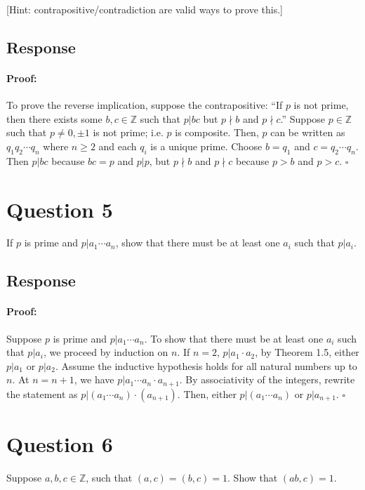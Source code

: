 \documentclass [12pt] {article}
\newcommand{\Z}{\mathbb{Z}}
\newenvironment{proof}{\paragraph{Proof:}}{\hfill$\square$}
\begin{document}
[Hint: contrapositive/contradiction are valid ways to prove this.]

\subsection*{Response}
\begin{proof}
    To prove the reverse implication, suppose the contrapositive: ``If $p$ is not prime, then there 
    exists some $b, c \in \Z$ such that $p | bc$ but $p \nmid b$ and $p \nmid c$.'' Suppose $p \in 
    \Z$ such that $p \neq 0, \pm 1$ is not prime; i.e. $p$ is composite. Then, $p$ can be written 
    as $q_1 q_2 \cdots q_n$ where $n \geq 2$ and each $q_i$ is a unique prime. Choose $b = q_1$ and 
    $c = q_2 \cdots q_n$. Then $p | bc$ because $bc = p$ and $p | p$, but $p \nmid b$ and $p \nmid c$
    because $p > b$ and $p > c$.
\end{proof}



\newpage

\section*{Question 5}
If $p$ is prime and $p|a_1 \cdots a_n$, show that there must be at least one $a_i$ such that $p|a_i$. 

\subsection*{Response}
\begin{proof}
    Suppose $p$ is prime and $p | a_1 \cdots a_n$. To show that there must be at least one $a_i$ 
    such that $p | a_i$, we proceed by induction on $n$. If $n = 2$, $p | a_1 \cdot a_2$, by 
    Theorem 1.5, either $p | a_1$ or $p | a_2$. Assume the inductive hypothesis holds for all 
    natural numbers up to $n$. At $n = n + 1$, we have $p | a_1 \cdots a_n \cdot a_{n + 1}$. By 
    associativity of the integers, rewrite the statement as 
    $p | (a_1 \cdots a_n) \cdot (a_{n + 1})$. Then, either $p | (a_1 \cdots a_n)$ or $p | a_{n + 1}$.
\end{proof}
\newpage

\section*{Question 6}
Suppose $a,b,c\in\Z$, such that $(a,c)=(b,c)=1$. Show that $(ab,c)=1$. 
\end{document}
